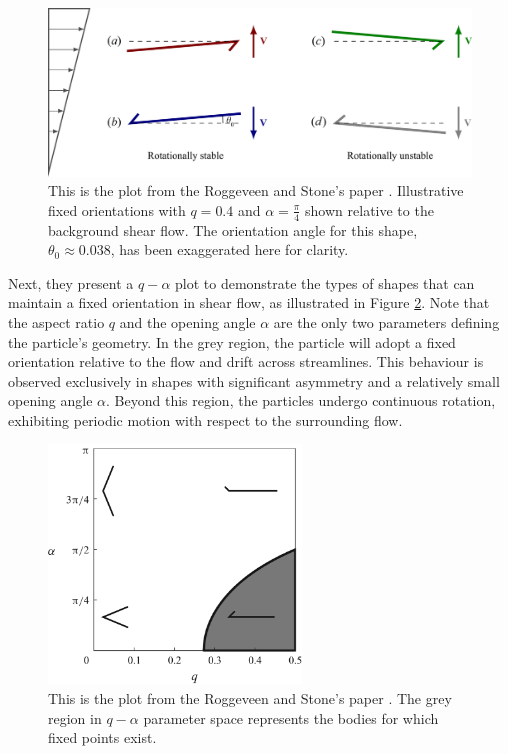 \documentclass[12pt,MSc,twoside]{muthesis_2020}
\begin{document}
\begin{figure}[htb]
	\begin{center}
		\includegraphics[width=1\textwidth]{plot/stone3.png}
		\caption{This is the plot from the Roggeveen and Stone's paper \cite{roggeveen2022motion}. Illustrative fixed orientations with $q=0.4$ and $\alpha=\frac{\pi}{4}$ shown relative to the background shear flow. The orientation angle for this shape, $\theta_0\approx0.038$, has been exaggerated here for clarity.}
    \label{fig:18}
	\end{center}
\end{figure}
Next, they present a $q-\alpha$ plot to demonstrate the types of shapes that can maintain a fixed orientation in shear flow, as illustrated in Figure \ref{fig:19}. Note that the aspect ratio $q$ and the opening angle $\alpha$ are the only two parameters defining the particle's geometry. In the grey region, the particle will adopt a fixed orientation relative to the flow and drift across streamlines. This behaviour is observed exclusively in shapes with significant asymmetry and a relatively small opening angle $\alpha$. Beyond this region, the particles undergo continuous rotation, exhibiting periodic motion with respect to the surrounding flow.
\begin{figure}[htb]
	\begin{center}
		\includegraphics[width=0.6\textwidth]{plot/stone.png}
		\caption{This is the plot from the Roggeveen and Stone's paper \cite{roggeveen2022motion}. The grey region in $q-\alpha$ parameter space represents the bodies for which fixed points exist.}
    \label{fig:19}
	\end{center}
\end{figure}
\end{document}
